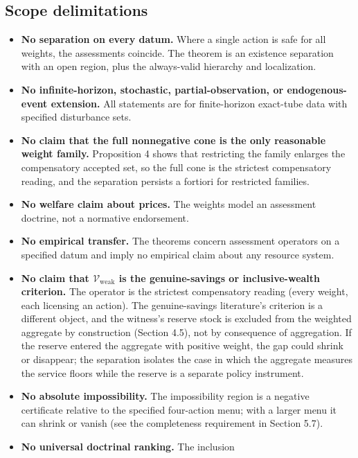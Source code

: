 \documentclass[3p,11pt]{elsarticle}
\providecommand{\tightlist}{\setlength{\itemsep}{0pt}\setlength{\parskip}{0pt}}
\begin{document}
\subsection{Scope delimitations}\label{scope-delimitations}

\begin{itemize}
\tightlist
\item
  \textbf{No separation on every datum.} Where a single action is safe
  for all weights, the assessments coincide. The theorem is an existence
  separation with an open region, plus the always-valid hierarchy and
  localization.
\item
  \textbf{No infinite-horizon, stochastic, partial-observation, or
  endogenous-event extension.} All statements are for finite-horizon exact-tube data with specified disturbance sets.
\item
  \textbf{No claim that the full nonnegative cone is the only reasonable
  weight family.} Proposition 4 shows that restricting the family
  enlarges the compensatory accepted set, so the full cone is the strictest compensatory reading, and the separation persists a fortiori for restricted families.
\item
  \textbf{No welfare claim about prices.} The weights model an
  assessment doctrine, not a normative endorsement.
\item
  \textbf{No empirical transfer.} The theorems concern assessment operators on a specified datum and imply no empirical claim about any resource system.
\item
  \textbf{No claim that \(\mathcal{V}_{\mathrm{weak}}\) is the
  genuine-savings or inclusive-wealth criterion.} The operator is the
  strictest compensatory reading (every weight, each licensing an
  action). The genuine-savings literature's criterion is a different
  object, and the witness's reserve stock is excluded from the weighted aggregate by construction (Section 4.5), not by consequence of aggregation. If the reserve entered the aggregate with positive weight, the gap could shrink or disappear; the separation isolates the case in which the aggregate measures the service floors while the reserve is a separate policy instrument.
\item
  \textbf{No absolute impossibility.} The impossibility region is a negative certificate relative to the specified four-action menu; with a larger menu it can shrink or vanish (see the completeness requirement in Section 5.7).
\item
  \textbf{No universal doctrinal ranking.} The inclusion

\end{itemize}
\end{document}
